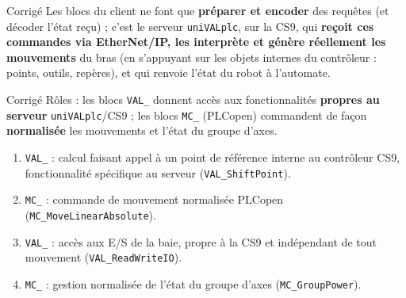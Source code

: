 \begin{UPSTIactivite}

\begin{UPSTIcorrectionP}{Corrigé}
Les blocs du client ne font que \textbf{préparer et encoder} des requêtes
(et décoder l'état reçu) ; c'est le serveur \texttt{uniVALplc}, sur la CS9,
qui \textbf{reçoit ces commandes via EtherNet/IP, les interprète et génère
réellement les mouvements} du bras (en s'appuyant sur les objets internes
du contrôleur : points, outils, repères), et qui renvoie l'état du robot
à l'automate.
\end{UPSTIcorrectionP}


\begin{UPSTIcorrectionP}{Corrigé}
Rôles : les blocs \texttt{VAL\_} donnent accès aux fonctionnalités
\textbf{propres au serveur} \texttt{uniVALplc}/CS9 ; les blocs \texttt{MC\_}
(PLCopen) commandent de façon \textbf{normalisée} les mouvements et l'état
du groupe d'axes.
\begin{enumerate}
    \item \texttt{VAL\_} : calcul faisant appel à un point de référence
    interne au contrôleur CS9, fonctionnalité spécifique au serveur
    (\texttt{VAL\_ShiftPoint}).
    \item \texttt{MC\_} : commande de mouvement normalisée PLCopen
    (\texttt{MC\_MoveLinearAbsolute}).
    \item \texttt{VAL\_} : accès aux E/S de la baie, propre à la CS9 et
    indépendant de tout mouvement (\texttt{VAL\_ReadWriteIO}).
    \item \texttt{MC\_} : gestion normalisée de l'état du groupe d'axes
    (\texttt{MC\_GroupPower}).
\end{enumerate}
\end{UPSTIcorrectionP}


\end{UPSTIactivite}
